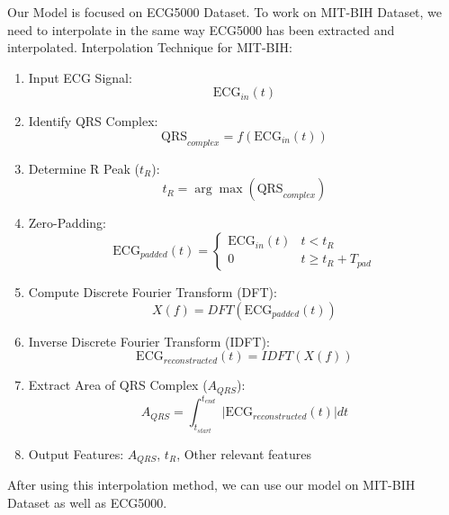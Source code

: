 \documentclass[nonacm,sigconf]{acmart}
\begin{document}
Our Model is focused on ECG5000 Dataset. To work on MIT-BIH Dataset, we need to interpolate in the same way ECG5000 has been extracted and interpolated. Interpolation Technique\cite{castiglioni2003interpolation} for MIT-BIH:
\begin{enumerate}
\item  Input ECG Signal: 
   \[
   \text{ECG}_{in}(t)
   \]

\item  Identify QRS Complex: 
   \[
   \text{QRS}_{complex} = f(\text{ECG}_{in}(t))
   \]

\item  Determine R Peak (\(t_R\)): 
   \[
   t_R = \arg\max(\text{QRS}_{complex})
   \]

\item  Zero-Padding: 
   \[
   \text{ECG}_{padded}(t) = 
   \begin{cases} 
   \text{ECG}_{in}(t) & t < t_R \\ 
   0 & t \geq t_R + T_{pad} 
   \end{cases}
   \]

\item  Compute Discrete Fourier Transform (DFT): 
   \[
   X(f) = DFT(\text{ECG}_{padded}(t))
   \]

\item  Inverse Discrete Fourier Transform (IDFT): 
   \[
   \text{ECG}_{reconstructed}(t) = IDFT(X(f))
   \]

\item  Extract Area of QRS Complex (\(A_{QRS}\)): 
   \[
   A_{QRS} = \int_{t_{start}}^{t_{end}} |\text{ECG}_{reconstructed}(t)| dt
   \]

\item  Output Features: 
    \(A_{QRS}\),
    \(t_R\),
    Other relevant features
\end{enumerate}
After using this interpolation method, we can use our model on MIT-BIH Dataset as well as ECG5000.
\end{document}
